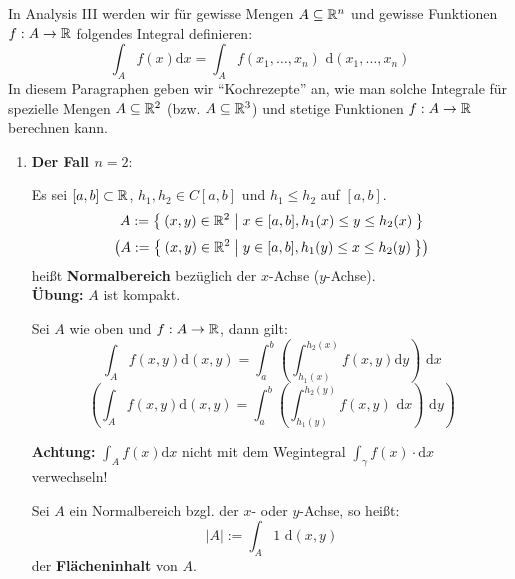 \documentclass[a4paper,oneside,DIV15,BCOR12mm,chapterprefix=true,headings=onelinechapter]{scrbook}
\begin{document}
In Analysis III werden wir für gewisse Mengen $A\subseteq\mathbb{R}^n$ und gewisse Funktionen
$f:A\to\mathbb{R}$ folgendes Integral definieren:
\[\int_A f(x)\text{d}x=\int_A f(x_1,\ldots,x_n)\text{ d}(x_1,\ldots,x_n)\]
In diesem Paragraphen geben wir "`Kochrezepte"' an, wie man solche Integrale
für spezielle Mengen $A \subseteq \mathbb{R}^2$ (bzw. $A \subseteq \mathbb{R}^3$) 
und stetige Funktionen $f:A \to \mathbb{R}$ berechnen kann.

\renewcommand{\theenumi}{\Roman{enumi}}
\renewcommand{\labelenumi}{\theenumi}

\begin{enumerate}
\item \textbf{Der Fall $n=2$}:\\
\begin{definition*}
Es sei $[a,b]\subset\mathbb{R}$, $h_1,h_2\in C[a,b]$ und $h_1\le h_2$ auf $[a,b]$.
\[A:=\Set{(x,y)\in\ensuremath{\mathbb{R}}^2 | x\in[a,b],h_1(x)\le y\le h_2(x)}\]
\[\left(A:=\Set{(x,y)\in\ensuremath{\mathbb{R}}^2 | y\in[a,b],h_1(y)\le x\le h_2(y)}\right)\]
heißt \textbf{Normalbereich} bezüglich der $x$-Achse ($y$-Achse).\\
\textbf{Übung:} $A$ ist kompakt.
\end{definition*}

\begin{satz}
Sei $A$ wie oben und $f:A\to\mathbb{R}$, dann gilt:
\[\int_A f(x,y)\text{d}(x,y)=\int_a^b\left(\int_{h_1(x)}^{h_2(x)} f(x,y)\text{d}y\right)\text{ d}x\]
\[\left(\int_A f(x,y)\text{d}(x,y)=\int_a^b\left(\int_{h_1(y)}^{h_2(y)} f(x,y)\text{ d}x\right)\text{ d}y\right)\]
\end{satz}

\textbf{Achtung:} $\int_A f(x)\text{d}x$ nicht mit dem Wegintegral $\int_\gamma f(x)\cdot\text{d}x$
verwechseln!

\begin{definition*}
Sei $A$ ein Normalbereich bzgl. der $x$- oder $y$-Achse, so heißt:
\[|A|:=\int_A 1\text{ d}(x,y)\]
der \textbf{Flächeninhalt} von $A$.
\end{definition*}


\end{enumerate}
\end{document}
